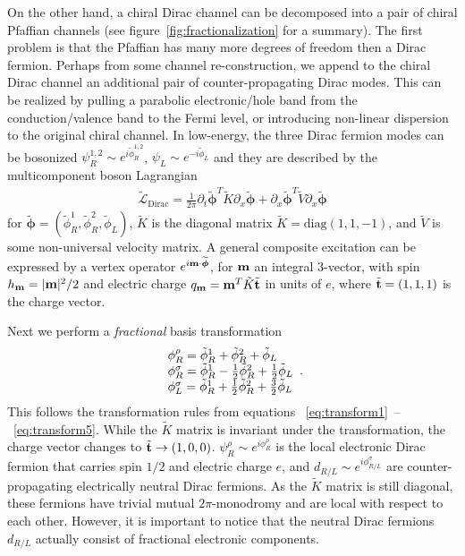 On the other hand, a chiral Dirac channel can be decomposed into a pair of chiral Pfaffian channels (see figure~\ref{fig:fractionalization} for a summary). The first problem is that the Pfaffian has many more degrees of freedom then a Dirac fermion. Perhaps from some channel re-construction, we append to the chiral Dirac channel an additional pair of counter-propagating Dirac modes. This can be realized by pulling a parabolic electronic/hole band from the conduction/valence band to the Fermi level, or introducing non-linear dispersion to the original chiral channel. In low-energy, the three Dirac fermion modes can be bosonized $\psi^{1,2}_R\sim e^{i\tilde\phi_R^{1,2}}$, $\psi_L\sim e^{-i\tilde\phi_L}$ and they are described by the multicomponent boson Lagrangian \begin{align}\widetilde{\mathcal{L}}_{\mathrm{Dirac}}=\frac{1}{2\pi}\partial_t\widetilde{\boldsymbol\phi}^T\tilde{K}\partial_x\widetilde{\boldsymbol\phi}+\partial_x\widetilde{\boldsymbol\phi}^T\tilde{V}\partial_x\widetilde{\boldsymbol\phi}\label{3Dirac}\end{align} for $\widetilde{\boldsymbol\phi}=(\tilde\phi_R^1,\tilde\phi_R^2,\tilde\phi_L)$, $\tilde{K}$ is the diagonal matrix $\tilde{K}=\mathrm{diag}(1,1,-1)$, and $\tilde{V}$ is some non-universal velocity matrix. A general composite excitation can be expressed by a vertex operator $e^{i{\bf m}\cdot\widetilde{\boldsymbol\phi}}$, for ${\bf m}$ an integral 3-vector, with spin $h_{\bf m}=|{\bf m}|^2/2$ and electric charge $q_{\bf m}={\bf m}^T\tilde{K}\tilde{\bf t}$ in units of $e$, where $\tilde{\bf t}=(1,1,1)$ is the charge vector.

Next we perform a {\em fractional} basis transformation \begin{align}\begin{array}{*{20}l}\phi^\rho_R=\tilde\phi^1_R+\tilde\phi^2_R+\tilde\phi_L\\\phi^\sigma_R=\tilde\phi^1_R-\frac{1}{2}\tilde\phi^2_R+\frac{1}{2}\tilde\phi_L\\\phi^\sigma_L=\tilde\phi^1_R+\frac{1}{2}\tilde\phi^2_R+\frac{3}{2}\tilde\phi_L\end{array}.\label{fracbasistrans0}\end{align} This follows the transformation rules from equations ~\ref{eq:transform1}~--~\ref{eq:transform5}. While the $\tilde{K}$ matrix is invariant under the transformation, the charge vector changes to $\tilde{\bf t}\to(1,0,0)$. $\psi^\rho_R\sim e^{i\phi^\rho_R}$ is the local electronic Dirac fermion that carries spin $1/2$ and electric charge $e$, and $d_{R/L}\sim e^{i\phi^\sigma_{R/L}}$ are counter-propagating electrically neutral Dirac fermions. As the $\tilde{K}$ matrix is still diagonal, these fermions have trivial mutual $2\pi$-monodromy and are local with respect to each other. However, it is important to notice that the neutral Dirac fermions $d_{R/L}$ actually consist of fractional electronic components.

